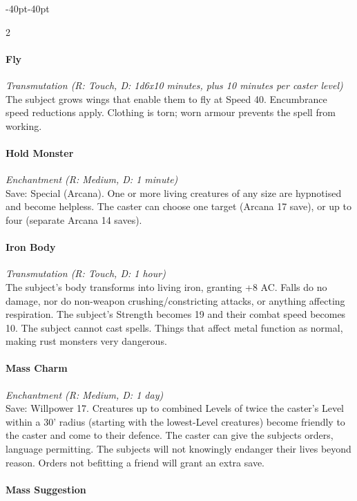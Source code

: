 \documentclass{book}
\begin{document}
\begin{adjustwidth}{-40pt}{-40pt}
\begin{multicols}{2}
\paragraph{Fly}\label{fly}

\emph{Transmutation (R: Touch, D: 1d6x10 minutes, plus 10 minutes per
	caster level)}\\
The subject grows wings that enable them to fly at Speed 40. Encumbrance
speed reductions apply. Clothing is torn; worn armour prevents the spell
from working.

\paragraph{Hold Monster}\label{hold-monster}

\emph{Enchantment (R: Medium, D: 1 minute)}\\
Save: Special (Arcana). One or more living creatures of any size are
hypnotised and become helpless. The caster can choose one target (Arcana
17 save), or up to four (separate Arcana 14 saves).

\paragraph{Iron Body}\label{iron-body}

\emph{Transmutation (R: Touch, D: 1 hour)}\\
The subject's body transforms into living iron, granting +8 AC. Falls do
no damage, nor do non-weapon crushing/constricting attacks, or anything
affecting respiration. The subject's Strength becomes 19 and their
combat speed becomes 10. The subject cannot cast spells. Things that
affect metal function as normal, making rust monsters very dangerous.

\paragraph{Mass Charm}\label{mass-charm}

\emph{Enchantment (R: Medium, D: 1 day)}\\
Save: Willpower 17. Creatures up to combined Levels of twice the
caster's Level within a 30' radius (starting with the lowest-Level
creatures) become friendly to the caster and come to their defence. The
caster can give the subjects orders, language permitting. The subjects
will not knowingly endanger their lives beyond reason. Orders not
befitting a friend will grant an extra save.

\paragraph{Mass Suggestion}\label{mass-suggestion}


\end{multicols}
\end{adjustwidth}
\end{document}
